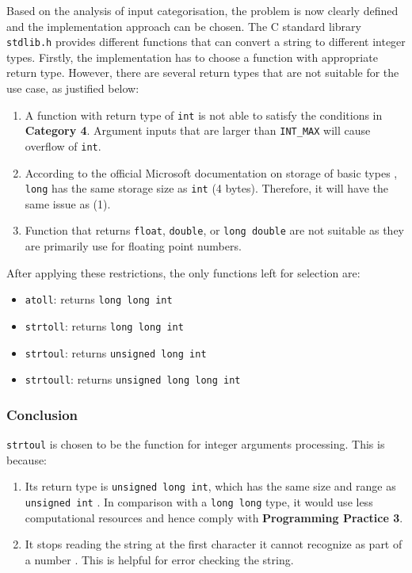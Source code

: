 \documentclass[12pt, a4paper]{article}
\begin{document}
Based on the analysis of input categorisation, the problem is now clearly defined and the
implementation approach can be chosen. The C standard library \texttt{stdlib.h} provides
different functions that can convert a string to different integer types. Firstly, the
implementation has to choose a function with appropriate return type. However, there are several
return types that are not suitable for the use case, as justified below:
\begin{enumerate}
    \item A function with return type of \texttt{int} is not able to
    satisfy the conditions in \textbf{Category 4}. Argument inputs that are larger than
    \texttt{INT_MAX} will cause overflow of \texttt{int}.

    \item According to the official Microsoft documentation on storage of basic types
    \cite{basic_types_storage}, \texttt{long} has the same storage size as
    \texttt{int} (4 bytes). Therefore, it will have the same issue as (1).

    \item Function that returns \texttt{float}, \texttt{double}, or
    \texttt{long double} are not suitable as they are primarily use for floating point
    numbers.
\end{enumerate}

After applying these restrictions, the only functions left for selection are:
\begin{itemize}
    \item \texttt{atoll}: returns \texttt{long long int}
    \item \texttt{strtoll}: returns \texttt{long long int}
    \item \texttt{strtoul}: returns \texttt{unsigned long int}
    \item \texttt{strtoull}: returns \texttt{unsigned long long int}
\end{itemize}

\subsubsection*{Conclusion}
\texttt{strtoul} is chosen to be the function for integer arguments processing. This is
because:
\begin{enumerate}
    \item Its return type is \texttt{unsigned long int}, which has the same size and range as
    \texttt{unsigned int} \cite{basic_types_storage}. In comparison with a
    \texttt{long long} type, it would use less computational resources and hence comply with
    \textbf{Programming Practice 3}.
    \item It stops reading the string at the first character it cannot recognize as part of a number
    \cite{strtoul}. This is helpful for error checking the string.
\end{enumerate}
\end{document}
